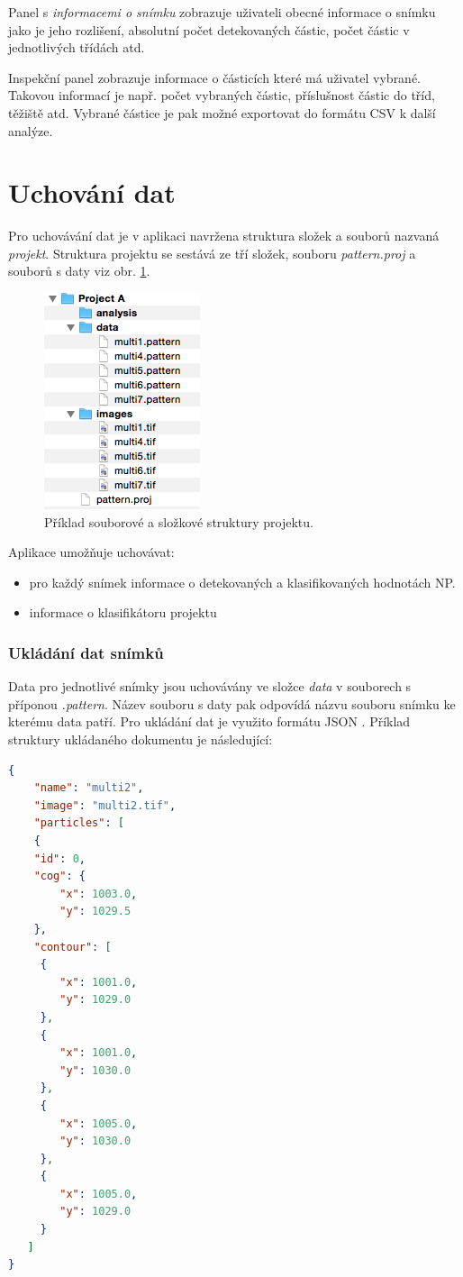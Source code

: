 \documentclass[11pt,twoside,a4paper,table]{book}
\begin{document}
Panel s \textit{informacemi o snímku} zobrazuje uživateli obecné informace o snímku jako je jeho rozlišení, absolutní počet detekovaných částic, počet částic v jednotlivých třídách atd.

Inspekční panel zobrazuje informace o částicích které má uživatel vybrané. Takovou informací je např. počet vybraných částic, příslušnost částic do tříd, těžiště atd. Vybrané částice je pak možné exportovat do formátu CSV k další analýze.

\section{Uchování dat}
\label{sec:uchovani_dat}
Pro uchovávání dat je v aplikaci navržena struktura složek a souborů nazvaná \textit{projekt}. Struktura projektu se sestává ze tří složek, souboru \textit{pattern.proj} a souborů s daty viz obr. \ref{fig:project_structure}.

\begin{figure}
\centering
\includegraphics[scale=1]{figures/app_project_structure.png}
\caption{Příklad souborové a složkové struktury projektu.}
\label{fig:project_structure}
\end{figure}

Aplikace umožňuje uchovávat:
\begin{itemize}
\item pro každý snímek informace o detekovaných a klasifikovaných hodnotách NP.
\item informace o klasifikátoru projektu
\end{itemize}

\subsubsection{Ukládání dat snímků}
Data pro jednotlivé snímky jsou uchovávány ve složce \textit{data} v souborech s příponou \textit{.pattern}. Název souboru s daty pak odpovídá názvu souboru snímku ke kterému data patří. Pro ukládání dat je využito formátu JSON \cite{json}. Příklad struktury ukládaného dokumentu je následující:
\begin{lstlisting}[language=json,firstnumber=1]
{
	"name": "multi2",
	"image": "multi2.tif",
	"particles": [
  	{
  	"id": 0,
  	"cog": {
     	"x": 1003.0,
     	"y": 1029.5
   	},
   	"contour": [
     {
     	"x": 1001.0,
     	"y": 1029.0
     },
     {
     	"x": 1001.0,
     	"y": 1030.0
     },
     {
     	"x": 1005.0,
     	"y": 1030.0
     },
     {
     	"x": 1005.0,
     	"y": 1029.0
     }
   ]
}
\end{lstlisting}
\end{document}
